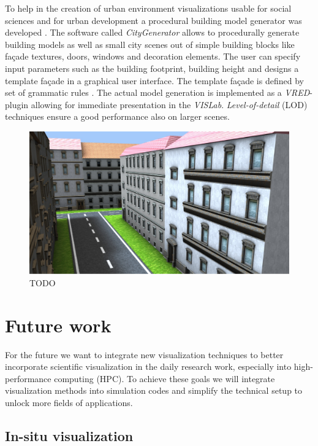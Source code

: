 To help in the creation of urban environment visualizations usable for social sciences and for urban development a procedural \cite{procedural:modelling} building model generator was developed \cite{bilke:master}. The software called \emph{CityGenerator} \cite{bilke:citygenerator} allows to procedurally generate building models as well as small city scenes out of simple building blocks like façade textures, doors, windows and decoration elements. The user can specify input parameters such as the building footprint, building height and designs a template façade in a graphical user interface. The template façade is defined by set of grammatic rules \cite{procedural:buildings}. The actual model generation is implemented as a \emph{VRED}-plugin allowing for immediate presentation in the \emph{VISLab}. \emph{Level-of-detail} (LOD) techniques ensure a good performance also on larger scenes.

\begin{figure}
  \includegraphics[width=\linewidth]{images/city.jpg}
\caption{TODO}
\label{fig:city}
\end{figure}

\section{Future work}
\label{future-work}

For the future we want to integrate new visualization techniques to better incorporate scientific visualization in the daily research work, especially into high-performance computing (HPC). To achieve these goals we will integrate visualization methods into simulation codes and simplify the technical setup to unlock more fields of applications.

\subsection{In-situ visualization}
\label{in-situ-visualization}

